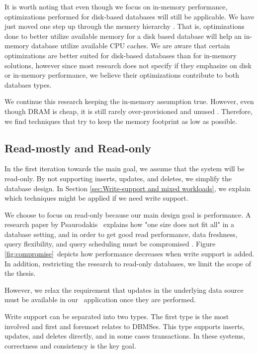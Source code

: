 It is worth noting that even though we focus on in-memory performance, optimizations performed for disk-based databases will still be applicable. We have just moved one step up through the memery hierarchy \cite{Boncz2002-yj}. That is, optimizations done to better utilize available memory for a disk based database will help an in-memory database utilize available CPU caches. We are aware that certain optimizations are better suited for disk-based databases than for in-memory solutions, however since most research does not specify if they emphasize on disk or in-memory performance, we believe their optimizations contribute to both databaes types. 

We continue this research keeping the in-memory assumption true. However, even though DRAM is cheap, it is still rarely over-provisioned and unused \cite{Barber2014-ey}. Therefore, we find techniques that try to keep the memory footprint as low as possible.

\subsection{Read-mostly and Read-only}
\label{sub:Read-mostly and Read-only}
In the first iteration towards the main goal, we assume that the system will be read-only. By not supporting inserts, updates, and deletes, we simplify the database design. In Section \ref{sec:Write-support and mixed workloads}, we explain which techniques might be applied if we need write support.

We choose to focus on read-only because our main design goal is performance. A research paper by Psaurodakis \ea~explains how "one size does not fit all" in a database setting, and in order to get good read performance, data freshness, query flexibility, and query scheduling must be compromised \cite{Psaroudakis2014-ma}. Figure \ref{fig:compromise}~depicts how performance decreases when write support is added. In addition, restricting the research to read-only databases, we limit the scope of the thesis. 

However, we relax the requirement that updates in the underlying data source must be available in our \bd~application once they are performed.

Write support can be separated into two types. The first type is the most involved and first and foremost relates to DBMSes. This type supports inserts, updates, and deletes directly, and in some cases transactions. In these systems, correctness and consistency is the key goal.

